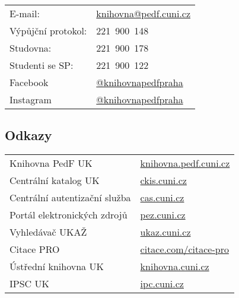 \begin{tabular}{@{}ll@{}}
  E-mail:& \url{knihovna@pedf.cuni.cz}\\

  Výpůjční protokol:& 221~900~148\\

  Studovna:& 221~900~178\\
  Studenti se SP:& 221~900~122\\
  Facebook & \url{@knihovnapedfpraha}\\
  Instagram & \url{@knihovnapedfpraha}
\end{tabular}

\subsection{Odkazy}

\begin{tabular}{@{}ll@{}}
  Knihovna PedF UK& \url{knihovna.pedf.cuni.cz} \\

  Centrální katalog UK& \url{ckis.cuni.cz} \\

  Centrální autentizační služba& \url{cas.cuni.cz} \\

  Portál elektronických zdrojů& \url{pez.cuni.cz} \\

  Vyhledávač UKAŽ & \url{ukaz.cuni.cz} \\

  Citace PRO & \url{citace.com/citace-pro} \\

  Ústřední knihovna UK & \url{knihovna.cuni.cz} \\

  IPSC UK & \url{ipc.cuni.cz} 
\end{tabular}
